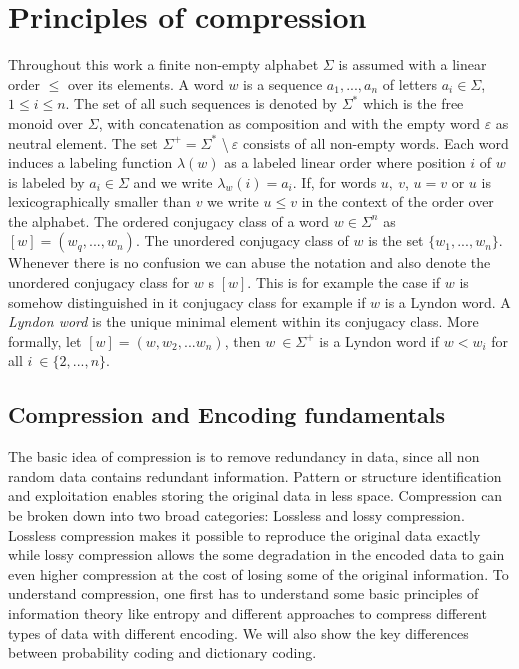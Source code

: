 
\chapter{Principles of compression}
\label{ch:Principles of compression}
\par{
Throughout this work a finite non-empty alphabet $\Sigma$ is assumed with a linear order $\leq$ over its elements. A word $w$ is a sequence $a_1,...,a_n$ of letters $a_i \in \Sigma$, $1 \leq i \leq n$. The set of all such sequences is denoted by $\Sigma^*$ which is the free monoid over $\Sigma$, with concatenation as composition and with the empty word $\varepsilon$ as neutral element. The set $\Sigma^+ = \Sigma^*$ \textbackslash $\: \varepsilon$ consists of all non-empty words. Each word induces a labeling function $\lambda(w)$ as a labeled linear order where position $i$ of $w$ is labeled by $a_i \in \Sigma$ and we write $\lambda_w (i) = a_i$. If, for words $u, \: v$,  $u = v$ or $u$ is lexicographically smaller than $v$ we write $u \leq v$ in the context of the order over the alphabet.  The ordered conjugacy class of a word $w \in \Sigma^n$ as $[w] = (w_q,...,w_n)$. The unordered conjugacy class of $w$ is the set $\{w_1, ... , w_n\}$. Whenever there is no confusion we can abuse the notation and also denote the unordered conjugacy class for $w$ s $[w]$. This is for example the case if $w$ is somehow distinguished in it conjugacy class for example if $w$ is a Lyndon word. A \emph{Lyndon word} is the unique minimal element within its conjugacy class. More formally, let $[w] = (w,w_2,...w_n)$, then $w \: \in \Sigma^+$ is a Lyndon word if $w<w_i$ for all $i \: \in \{2,...,n\}$.
}

\section{Compression and Encoding fundamentals}
\label{ch:Principles of compression:sec:Compression}
\par{
	The basic idea of compression is to remove redundancy in data, since all non random data contains redundant information. Pattern or structure identification and exploitation enables storing the original data in less space. Compression can be broken down into two broad categories: Lossless and lossy compression. Lossless compression makes it possible to reproduce the original data exactly while lossy compression allows the some degradation in the encoded data to gain even higher compression at the cost of losing some of the original information. To understand compression, one first has to understand some basic principles of information theory like entropy and different approaches to compress different types of data with different encoding. We will also show the key differences between probability coding and dictionary coding.}

